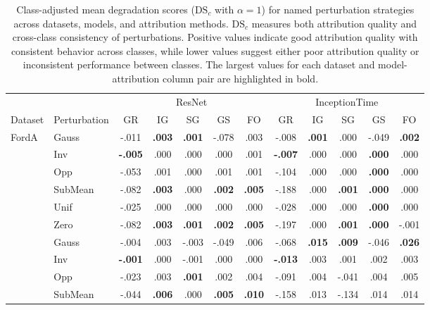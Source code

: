 \begin{table}[!htbp]
\caption{Class-adjusted mean degradation scores ($\text{DS}_c$ with $\alpha=1$) for named perturbation strategies across datasets, models, and attribution methods.
$\text{DS}_c$ measures both attribution quality and cross-class consistency of perturbations.
Positive values indicate good attribution quality with consistent behavior across classes, while lower values suggest either poor attribution quality or inconsistent performance between classes.
The largest values for each dataset and model-attribution column pair are highlighted in bold.}
\label{tab:adjusted_ds}
\setlength{\tabcolsep}{0pt}
\begin{tabular*}{\textwidth}{@{\extracolsep{\fill}} llcccccccccc @{}}
\toprule
 & & \multicolumn{5}{c}{ResNet} & \multicolumn{5}{c}{InceptionTime} \\
\cmidrule(lr){3-7} \cmidrule(lr){8-12}
Dataset & Perturbation & GR & IG & SG & GS & FO & GR & IG & SG & GS & FO \\
\midrule
\multirow[t]{7}{*}{FordA} & Gauss & -.011 & \textbf{.003} & \textbf{.001} & -.078 & .003 & -.008 & \textbf{.001} & .000 & -.049 & \textbf{.002} \\
 & Inv & \textbf{-.005} & .000 & .000 & .000 & .001 & \textbf{-.007} & .000 & .000 & \textbf{.000} & .000 \\
 & Opp & -.053 & .001 & .000 & .001 & .001 & -.104 & .000 & .000 & \textbf{.000} & .000 \\
 & SubMean & -.082 & \textbf{.003} & .000 & \textbf{.002} & \textbf{.005} & -.188 & .000 & \textbf{.001} & \textbf{.000} & .000 \\
 & Unif & -.025 & .000 & .000 & .000 & .000 & -.028 & .000 & .000 & \textbf{.000} & .000 \\
 & Zero & -.082 & \textbf{.003} & \textbf{.001} & \textbf{.002} & \textbf{.005} & -.197 & .000 & \textbf{.001} & \textbf{.000} & -.001 \\
\cline{1-12}
\multirow[t]{7}{*}{FordB} & Gauss & -.004 & .003 & -.003 & -.049 & .006 & -.068 & \textbf{.015} & \textbf{.009} & -.046 & \textbf{.026} \\
 & Inv & \textbf{-.001} & .000 & -.001 & .000 & .000 & \textbf{-.013} & .003 & .001 & .002 & .003 \\
 & Opp & -.023 & .003 & \textbf{.001} & .002 & .004 & -.091 & .004 & -.041 & .004 & .005 \\
 & SubMean & -.044 & \textbf{.006} & .000 & \textbf{.005} & \textbf{.010} & -.158 & .013 & -.134 & .014 & .014 \\

\end{tabular*}
\end{table}
